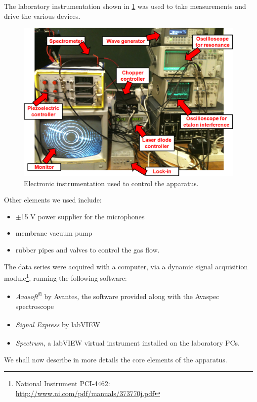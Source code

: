 The laboratory instrumentation shown in \cref{instrument} was used to take measurements and drive the various devices.
\begin{figure}[t]\centering
\includegraphics[width=\linewidth, draft=\foto]{eps/instrument.eps}
\caption{Electronic instrumentation used to control the apparatus.}
\label{instrument}
\end{figure}
Other elements we used include:
\begin{itemize}
\item $\pm$15 V power supplier for the microphones
\item membrane vacuum pump
\item rubber pipes and valves to control the gas flow.
\end{itemize}
The data series were acquired with a computer, via a dynamic signal acquisition module\footnote{National Instrument PCI-4462: \url{http://www.ni.com/pdf/manuals/373770j.pdf}}, running the following software:
\begin{itemize}
\item \textit{Avasoft}\textsuperscript{\copyright} by Avantes, the software provided along with the Avaspec spectroscope
\item \textit{Signal Express}\textsuperscript{\texttrademark} by labVIEW\textsuperscript{\texttrademark}
\item \textit{Spectrum}, a labVIEW\textsuperscript{\texttrademark} virtual instrument installed on the laboratory PCs.
\end{itemize}
 We shall now describe in more details the core elements of the apparatus.

 
